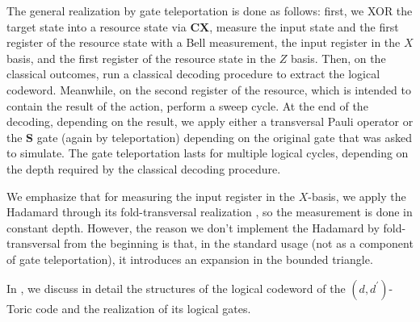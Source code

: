 The general realization by gate teleportation is done as follows: first, we XOR the target state into a resource state via $\mathbf{CX}$, measure the input state and the first register of the resource state with a Bell measurement, the input register in the $X$ basis, and the first register of the resource state in the $Z$ basis. Then, on the classical outcomes, run a classical decoding procedure to extract the logical codeword. Meanwhile, on the second register of the resource, which is intended to contain the result of the action, perform a sweep cycle. At the end of the decoding, depending on the result, we apply either a transversal Pauli operator or the $\mathbf{S}$ gate (again by teleportation) depending on the original gate that was asked to simulate. The gate teleportation lasts for multiple logical cycles, depending on the depth required by the classical decoding procedure.

We emphasize that for measuring the input register in the $X$-basis, we apply the Hadamard through its fold-transversal realization \cite{Breuckmann_2024}, so the measurement is done in constant depth. However, the reason we don't implement the Hadamard by fold-transversal from the beginning is that, in the standard usage (not as a component of gate teleportation), it introduces an expansion in the bounded triangle.



In , we discuss in detail the structures of the logical codeword of the $(d,d^{\prime})$-Toric code and the realization of its logical gates.


